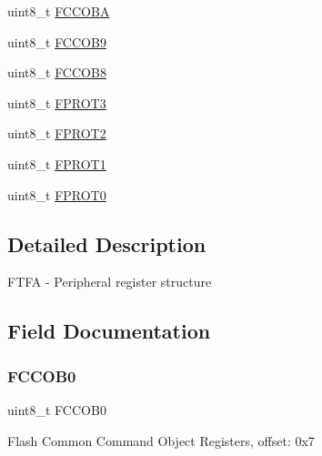 \begin{DoxyCompactItemize}
\item 
uint8\+\_\+t \hyperlink{struct_f_t_f_a___mem_map_aee01b0413a1bb74026a460da212a6f6d}{F\+C\+C\+O\+BA}
\item 
uint8\+\_\+t \hyperlink{struct_f_t_f_a___mem_map_ad4b7a9c387599f74d604a12eab7b3f8d}{F\+C\+C\+O\+B9}
\item 
uint8\+\_\+t \hyperlink{struct_f_t_f_a___mem_map_a098678952099a9d95ceb16bf591db8e4}{F\+C\+C\+O\+B8}
\item 
uint8\+\_\+t \hyperlink{struct_f_t_f_a___mem_map_a84a4810c0a2da0b5c5a6205e551e0bf6}{F\+P\+R\+O\+T3}
\item 
uint8\+\_\+t \hyperlink{struct_f_t_f_a___mem_map_adfb9669bc3184da7e4b49c320970b1df}{F\+P\+R\+O\+T2}
\item 
uint8\+\_\+t \hyperlink{struct_f_t_f_a___mem_map_a99308b5052058ad416c35ce9f82507f5}{F\+P\+R\+O\+T1}
\item 
uint8\+\_\+t \hyperlink{struct_f_t_f_a___mem_map_a36693d749fac8e3f218744ab5da5cda1}{F\+P\+R\+O\+T0}
\end{DoxyCompactItemize}


\subsection{Detailed Description}
F\+T\+FA -\/ Peripheral register structure 

\subsection{Field Documentation}
\mbox{\label{struct_f_t_f_a___mem_map_a823ae05fb120635d89873f52f521120f}} 
\subsubsection{\texorpdfstring{F\+C\+C\+O\+B0}{FCCOB0}}
{\footnotesize\ttfamily uint8\+\_\+t F\+C\+C\+O\+B0}

Flash Common Command Object Registers, offset\+: 0x7 \mbox{\label{struct_f_t_f_a___mem_map_a263a6e9f6f0776df7d3bece9c50d65f0}} 
